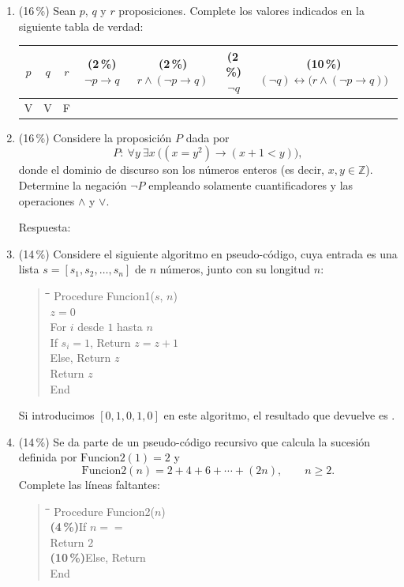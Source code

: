 \documentclass[11pt]{article}
\newcommand{\resp}{\underline{\hspace{2.5cm}}}
\newenvironment{pseudo}{%
  \begin{quote}\ttfamily\small\begin{tabbing}
  \hspace{2em}\=\hspace{2em}\=\hspace{2em}\=\kill}{%
  \end{tabbing}\end{quote}}
\begin{document}
\begin{enumerate}
\item (16\,\%) Sean $p$, $q$ y $r$ proposiciones. Complete los valores indicados en la siguiente tabla de verdad:
\begin{center}
\begin{tabular}{|c|c|c||c|c|c|c|}
\hline
$p$ & $q$ & $r$ & \small(2\,\%) $\neg p \to q$ & \small(2\,\%) $r \wedge (\neg p \to q)$ & \small(2\,\%) $\neg q$ & \small(10\,\%) $(\neg q) \leftrightarrow \bigl(r \wedge (\neg p \to q)\bigr)$ \\
\hline
V & V & F & & & & \\
\hline
\end{tabular}
\end{center}

\item (16\,\%) Considere la proposición $P$ dada por
\[
P : \ \forall y\ \exists x\ \bigl((x = y^2) \to (x + 1 < y)\bigr),
\]
donde el dominio de discurso son los números enteros (es decir, $x, y \in \mathbb{Z}$). Determine la negación $\neg P$ empleando solamente cuantificadores y las operaciones $\wedge$ y $\vee$.

\vspace{4pt}
Respuesta: \underline{\hspace{9cm}}

\item (14\,\%) Considere el siguiente algoritmo en pseudo-código, cuya entrada es una lista $s = [s_1, s_2, \dots, s_n]$ de $n$ números, junto con su longitud $n$:
\begin{pseudo}
Procedure Funcion1($s$, $n$)\\
\>$z = 0$\\
\>For $i$ desde $1$ hasta $n$\\
\>\>If $s_i = 1$, Return $z = z + 1$\\
\>\>Else, Return $z$\\
\>Return $z$\\
End
\end{pseudo}
Si introducimos $[0, 1, 0, 1, 0]$ en este algoritmo, el resultado que devuelve es \resp.

\item (14\,\%) Se da parte de un pseudo-código recursivo que calcula la sucesión definida por $\text{Funcion2}(1) = 2$ y
\[
\text{Funcion2}(n) = 2 + 4 + 6 + \cdots + (2n), \qquad n \geq 2.
\]
Complete las líneas faltantes:
\begin{pseudo}
Procedure Funcion2($n$)\\
\>\textbf{(4\,\%)}\quad If $n ==$ \resp\\
\>\>Return $2$\\
\>\textbf{(10\,\%)}\quad Else, Return \underline{\hspace{5cm}}\\
End
\end{pseudo}


\end{enumerate}
\end{document}
